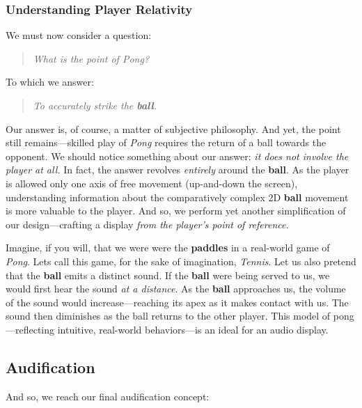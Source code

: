 \documentclass{report}
\newcommand{\state}[1]{\textbf{#1}}
\newcommand{\ball}{\textbf{ball}\xspace}
\begin{document}
\subsubsection{Understanding Player Relativity}
We must now consider a question: 
\begin{quote}
\emph{What is the point of Pong?}     
\end{quote}

To which we answer:
\begin{quote}
\emph{To accurately strike the \ball.}
\end{quote}

Our answer is, of course, a matter of subjective philosophy. And yet, the point still remains---skilled play of \emph{Pong} requires the return of a ball towards the opponent. We should notice something about our answer: \emph{it does not involve the player at all.} In fact, the answer revolves \emph{entirely} around the \ball. As the player is allowed only one axis of free movement (up-and-down the screen), understanding information about the comparatively complex 2D \ball movement is more valuable to the player. And so, we perform yet another simplification of our design---crafting a display \emph{from the player's point of reference.} 

Imagine, if you will, that we were were the \state{paddles} in a real-world game of \emph{Pong}. Lets call this game, for the sake of imagination, \emph{Tennis}. Let us also pretend that the \ball emits a distinct sound. If the \ball were being served to us, we would first hear the sound \emph{at a distance}. As the \ball approaches us, the volume of the sound would increase---reaching its apex as it makes contact with us. The sound then diminishes as the ball returns to the other player. This model of pong---reflecting intuitive, real-world behaviors---is an ideal for an audio display.

\subsection{Audification}
And so, we reach our final audification concept:
\end{document}
